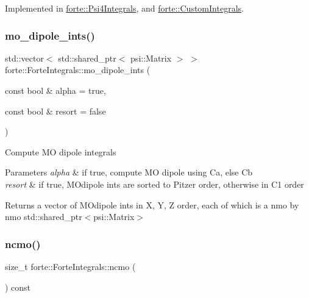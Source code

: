 Implemented in \mbox{\hyperlink{classforte_1_1_psi4_integrals_abfd1e7a105ef05bfe50d175fbe766c36}{forte\+::\+Psi4\+Integrals}}, and \mbox{\hyperlink{classforte_1_1_custom_integrals_aae47837ebc64bb62efb0c23107ebfafa}{forte\+::\+Custom\+Integrals}}.

\mbox{\label{classforte_1_1_forte_integrals_acf43a2d4203cd062a2e011b3e3dfde3a}} 
\subsubsection{\texorpdfstring{mo\+\_\+dipole\+\_\+ints()}{mo\_dipole\_ints()}}
{\footnotesize\ttfamily std\+::vector$<$ std\+::shared\+\_\+ptr$<$ psi\+::\+Matrix $>$ $>$ forte\+::\+Forte\+Integrals\+::mo\+\_\+dipole\+\_\+ints (\begin{DoxyParamCaption}\item[{const bool \&}]{alpha = {\ttfamily true},  }\item[{const bool \&}]{resort = {\ttfamily false} }\end{DoxyParamCaption})\hspace{0.3cm}{\ttfamily [virtual]}}

Compute MO dipole integrals 
\begin{DoxyParams}{Parameters}
{\em alpha} & if true, compute MO dipole using Ca, else Cb \\
\hline
{\em resort} & if true, M\+Odipole ints are sorted to Pitzer order, otherwise in C1 order \\
\hline
\end{DoxyParams}
\begin{DoxyReturn}{Returns}
a vector of M\+Odipole ints in X, Y, Z order, each of which is a nmo by nmo std\+::shared\+\_\+ptr$<$psi\+::\+Matrix$>$ 
\end{DoxyReturn}
\mbox{\label{classforte_1_1_forte_integrals_a3b78f05526be30dda1653d66f8dfdd74}} 
\subsubsection{\texorpdfstring{ncmo()}{ncmo()}}
{\footnotesize\ttfamily size\+\_\+t forte\+::\+Forte\+Integrals\+::ncmo (\begin{DoxyParamCaption}{ }\end{DoxyParamCaption}) const}



